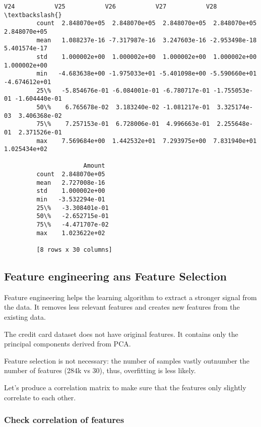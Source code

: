 \documentclass[11pt]{article}
\begin{document}
\begin{Verbatim}[commandchars=\\\{\}]
                         V24           V25           V26           V27           V28  \textbackslash{}
         count  2.848070e+05  2.848070e+05  2.848070e+05  2.848070e+05  2.848070e+05   
         mean   1.088237e-16 -7.317987e-16  3.247603e-16 -2.953498e-18  5.401574e-17   
         std    1.000002e+00  1.000002e+00  1.000002e+00  1.000002e+00  1.000002e+00   
         min   -4.683638e+00 -1.975033e+01 -5.401098e+00 -5.590660e+01 -4.674612e+01   
         25\%   -5.854676e-01 -6.084001e-01 -6.780717e-01 -1.755053e-01 -1.604440e-01   
         50\%    6.765678e-02  3.183240e-02 -1.081217e-01  3.325174e-03  3.406368e-02   
         75\%    7.257153e-01  6.728006e-01  4.996663e-01  2.255648e-01  2.371526e-01   
         max    7.569684e+00  1.442532e+01  7.293975e+00  7.831940e+01  1.025434e+02   
         
                      Amount  
         count  2.848070e+05  
         mean   2.727008e-16  
         std    1.000002e+00  
         min   -3.532294e-01  
         25\%   -3.308401e-01  
         50\%   -2.652715e-01  
         75\%   -4.471707e-02  
         max    1.023622e+02  
         
         [8 rows x 30 columns]
\end{Verbatim}
            
    \subsection{Feature engineering ans Feature
Selection}\label{feature-engineering-ans-feature-selection}

Feature engineering helps the learning algorithm to extract a stronger
signal from the data. It removes less relevant features and creates new
features from the existing data.

The credit card dataset does not have original features. It contains
only the principal components derived from PCA.

Feature selection is not necessary: the number of samples vastly
outnumber the number of features (284k vs 30), thus, overfitting is less
likely.

Let's produce a correlation matrix to make sure that the features only
slightly correlate to each other.

\subsubsection{Check correlation of
features}\label{check-correlation-of-features}
\end{document}
